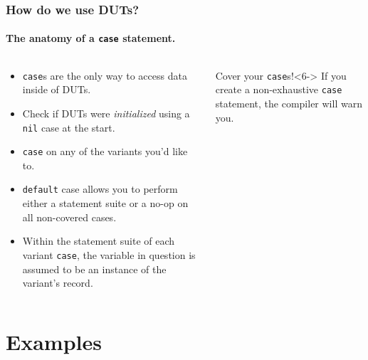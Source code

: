 \documentclass{beamer}
\begin{document}
\begin{frame}
 \frametitle{How do we use DUTs?}
 \framesubtitle{The anatomy of a \texttt{case} statement.}
    \begin{columns}[T,onlytextwidth]
        \begin{column}{.5\textwidth}
            \begin{minipage}{\textwidth}
                \begin{itemize}
                    \item<1-> \texttt{case}s are the only way to access data inside of DUTs.
                    \item<2-> Check if DUTs were \textit{initialized} using a \texttt{nil} case at the start.
                    \item<3-> \texttt{case} on any of the variants you'd like to.
                    \item<4-> \texttt{default} case allows you to perform either a statement suite or a no-op on all non-covered cases. 
                    \item<5-> Within the statement suite of each variant \texttt{case}, the variable in question is assumed to be an instance of the variant's record.
                \end{itemize}
            \end{minipage}
        \end{column}
        \begin{column}{.45\textwidth}
            \begin{onlyenv}
                \begin{minipage}{\textwidth}
                    \usebox{\anatomyOfCaseBox}
                    \begin{alertblock}{\footnotesize Cover your \texttt{case}s!}<6->
                        {\footnotesize If you create a non-exhaustive \texttt{case} statement, the compiler will warn you.}
                    \end{alertblock}
                \end{minipage}
            \end{onlyenv}
        \end{column}
    \end{columns}
\end{frame}

\section{Examples}
\end{document}
